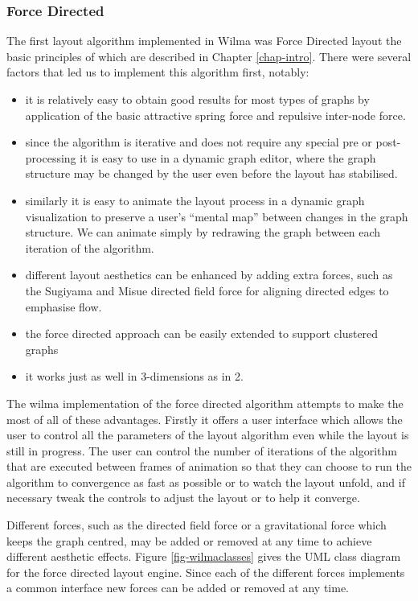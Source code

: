 \documentclass[runningheads]{cl2emult}
\begin{document}
\subsubsection{Force Directed} \label{sec:forcedirectedlayout}
The first layout algorithm implemented in Wilma was Force Directed
layout the basic principles of which are described in Chapter
\ref{chap-intro}.  There were several factors that led us to
implement this algorithm first, notably:
\begin{itemize}
\item it is relatively easy to obtain good results for most types of
graphs by application of the basic attractive spring force and
repulsive inter-node force.
\item since the algorithm is iterative and does not require any
special pre or post-processing it is easy to use in a dynamic graph
editor, where the graph structure may be changed by the user even
before the layout has stabilised.
\item similarly it is easy to animate the layout process in a dynamic
graph visualization to preserve a user's ``mental map''\cite{Misue:VLC95}
between changes in the graph structure.  We can animate simply by
redrawing the graph between each iteration of the algorithm.
\item different layout
aesthetics can be enhanced by adding extra forces, such as the Sugiyama and Misue\cite{Sugiyama:VLC95}
directed field force for aligning directed edges to emphasise flow.
\item the force directed approach can be easily extended to support
clustered graphs \cite{Huang:GD98}
\item it works just as well in 3-dimensions as in 2.
\end{itemize}
The wilma implementation of the force directed algorithm attempts to make the most
of all of these advantages.  Firstly it offers a user interface which
allows the user to control all the parameters of the layout algorithm
even while the layout is still in progress.  The user can control the
number of iterations of the algorithm that are executed between frames
of animation so that they can choose to run the algorithm to
convergence as fast as possible or to watch the layout unfold, and if
necessary tweak the controls to adjust the layout or to help it
converge.

Different forces, such as the directed field force or
a gravitational force which keeps the graph centred, may be added or removed
at any time to achieve different aesthetic effects.  Figure
\ref{fig-wilmaclasses} gives the UML class diagram for the force
directed layout engine.  Since each of the different forces implements
a common interface new forces can be added or removed at any time.
\end{document}
